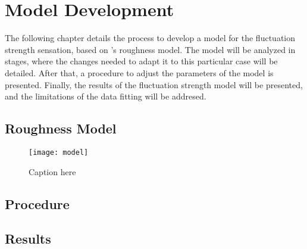 \documentclass[../main.tex]{subfiles}
\begin{document}
\chapter{Model Development}

\begin{modelchapter}

The following chapter details the process to develop a model for the fluctuation
strength sensation, based on \citeauthor{daniel1997psychoacoustical}'s roughness
model. The model will be analyzed in stages, where the changes needed to adapt
it to this particular case will be detailed. After that, a procedure to adjust
the parameters of the model is presented. Finally, the results of the
fluctuation strength model will be presented, and the limitations of the data
fitting will be addresed.

\section{Roughness Model}

\begin{figure}[!ht]
  \centering
  \texttt{[image: model]}
  \caption{Caption here}
  \label{fig:figure1}
\end{figure}

\section{Procedure}




\section{Results}



\end{modelchapter}
\end{document}
